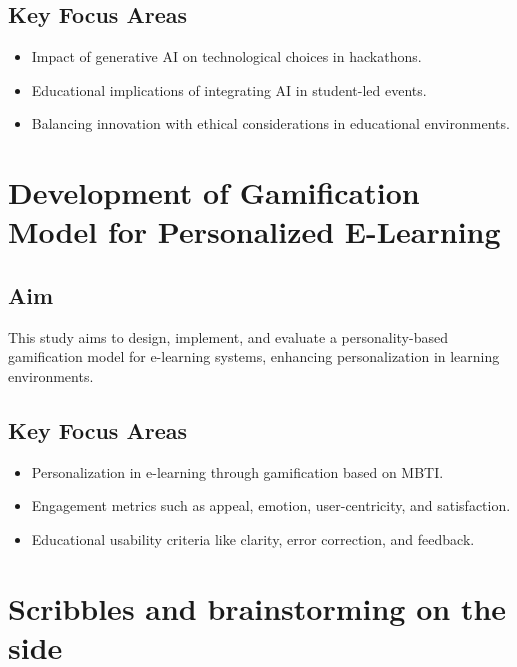 \documentclass{article}
\begin{document}
\subsection{Key Focus Areas}
\begin{itemize}
    \item Impact of generative AI on technological choices in hackathons.
    \item Educational implications of integrating AI in student-led events.
    \item Balancing innovation with ethical considerations in educational environments.
\end{itemize}

\newpage
\section{Development of Gamification Model for Personalized E-Learning}

\subsection{Aim}
This study aims to design, implement, and evaluate a personality-based gamification model for e-learning systems, enhancing personalization in learning environments.

\subsection{Key Focus Areas}
\begin{itemize}
    \item Personalization in e-learning through gamification based on MBTI.
    \item Engagement metrics such as appeal, emotion, user-centricity, and satisfaction.
    \item Educational usability criteria like clarity, error correction, and feedback.
\end{itemize}

\newpage
\section{Scribbles and brainstorming on the side}
\end{document}
